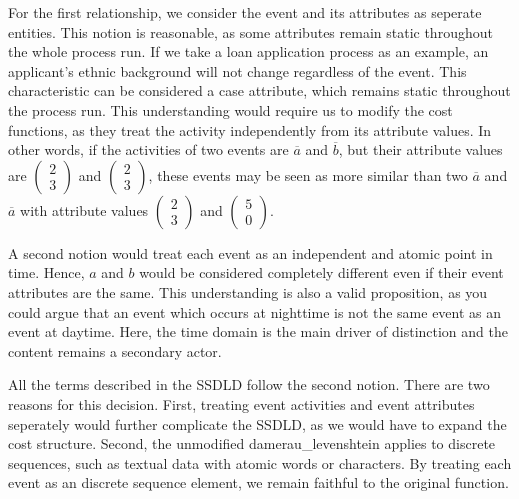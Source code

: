 \documentclass[./../../paper.tex]{subfiles}
\begin{document}
For the first relationship, we consider the event and its attributes as seperate entities. This notion is reasonable, as some attributes remain static throughout the whole process run. If we take a loan application process as an example, an applicant's ethnic background will not change regardless of the event. This characteristic can be considered a case attribute, which remains static throughout the process run. This understanding would require us to modify the cost functions, as they treat the activity independently from its attribute values. In other words, if the activities of two events are $\overline{a}$ and $\overline{b}$, but their attribute values are $\left(\begin{smallmatrix}2 \\ 3\end{smallmatrix}\right)$ and $\left(\begin{smallmatrix}2 \\ 3\end{smallmatrix}\right)$, these events may be seen as more similar than two $\overline{a}$ and $\overline{a}$ with attribute values $\left(\begin{smallmatrix}2 \\ 3\end{smallmatrix}\right)$ and $\left(\begin{smallmatrix}5 \\ 0\end{smallmatrix}\right)$. 

A second notion would treat each event as an independent and atomic point in time. Hence, $a$ and $b$ would be considered completely different even if their event attributes are the same. This understanding is also a valid proposition, as you could argue that an event which occurs at nighttime is not the same event as an event at daytime. Here, the time domain is the main driver of distinction and the content remains a secondary actor. 

All the terms described in the \gls{SSDLD} follow the second notion. There are two reasons for this decision. First, treating event activities and event attributes seperately would further complicate the \gls{SSDLD}, as we would have to expand the cost structure. Second, the unmodified \gls{damerau_levenshtein} applies to discrete sequences, such as textual data with atomic words or characters. By treating each event as an discrete sequence element, we remain faithful to the original function.
\end{document}
